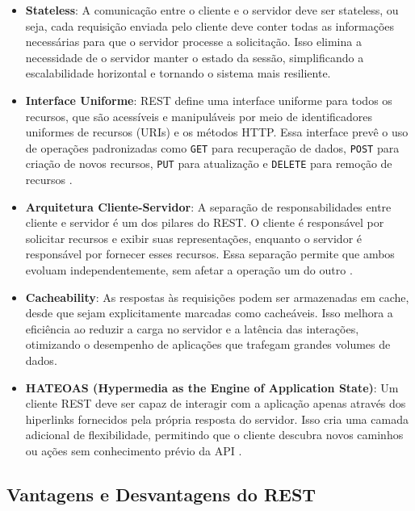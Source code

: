 \documentclass[12pt]{article}
\begin{document}
	\begin{itemize}
		\item \textbf{Stateless}: A comunicação entre o cliente e o servidor deve ser stateless, ou seja, cada requisição enviada pelo cliente deve conter todas as informações necessárias para que o servidor processe a solicitação. Isso elimina a necessidade de o servidor manter o estado da sessão, simplificando a escalabilidade horizontal e tornando o sistema mais resiliente.
		
		\item \textbf{Interface Uniforme}: REST define uma interface uniforme para todos os recursos, que são acessíveis e manipuláveis por meio de identificadores uniformes de recursos (URIs) e os métodos HTTP. Essa interface prevê o uso de operações padronizadas como \texttt{GET} para recuperação de dados, \texttt{POST} para criação de novos recursos, \texttt{PUT} para atualização e \texttt{DELETE} para remoção de recursos \cite{fielding2000}.
		
		\item \textbf{Arquitetura Cliente-Servidor}: A separação de responsabilidades entre cliente e servidor é um dos pilares do REST. O cliente é responsável por solicitar recursos e exibir suas representações, enquanto o servidor é responsável por fornecer esses recursos. Essa separação permite que ambos evoluam independentemente, sem afetar a operação um do outro \cite{cavaleiro2013}.
		
		\item \textbf{Cacheability}: As respostas às requisições podem ser armazenadas em cache, desde que sejam explicitamente marcadas como cacheáveis. Isso melhora a eficiência ao reduzir a carga no servidor e a latência das interações, otimizando o desempenho de aplicações que trafegam grandes volumes de dados.
		
		\item \textbf{HATEOAS (Hypermedia as the Engine of Application State)}: Um cliente REST deve ser capaz de interagir com a aplicação apenas através dos hiperlinks fornecidos pela própria resposta do servidor. Isso cria uma camada adicional de flexibilidade, permitindo que o cliente descubra novos caminhos ou ações sem conhecimento prévio da API \cite{fielding2000}.
	\end{itemize}
	
	\subsection{Vantagens e Desvantagens do REST}
	
\end{document}
